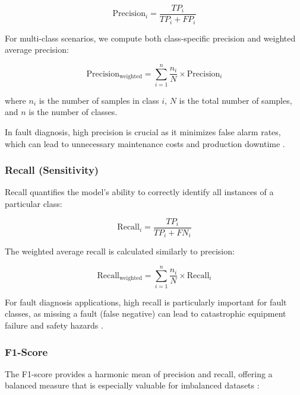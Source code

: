 \begin{equation}
\text{Precision}_i = \frac{TP_i}{TP_i + FP_i}
\end{equation}

For multi-class scenarios, we compute both class-specific precision and weighted average precision:

\begin{equation}
\text{Precision}_{\text{weighted}} = \sum_{i=1}^{n} \frac{n_i}{N} \times \text{Precision}_i
\end{equation}

where $n_i$ is the number of samples in class $i$, $N$ is the total number of samples, and $n$ is the number of classes.

In fault diagnosis, high precision is crucial as it minimizes false alarm rates, which can lead to unnecessary maintenance costs and production downtime \citep{zhao2019deep, lei2020applications}.

\subsubsection{Recall (Sensitivity)}
\label{subsubsec:recall}

Recall quantifies the model's ability to correctly identify all instances of a particular class:

\begin{equation}
\text{Recall}_i = \frac{TP_i}{TP_i + FN_i}
\end{equation}

The weighted average recall is calculated similarly to precision:

\begin{equation}
\text{Recall}_{\text{weighted}} = \sum_{i=1}^{n} \frac{n_i}{N} \times \text{Recall}_i
\end{equation}

For fault diagnosis applications, high recall is particularly important for fault classes, as missing a fault (false negative) can lead to catastrophic equipment failure and safety hazards \citep{zhang2019deep, liu2018artificial}.

\subsubsection{F1-Score}
\label{subsubsec:f1_score}

The F1-score provides a harmonic mean of precision and recall, offering a balanced measure that is especially valuable for imbalanced datasets \citep{he2009learning, saito2015precision}:

